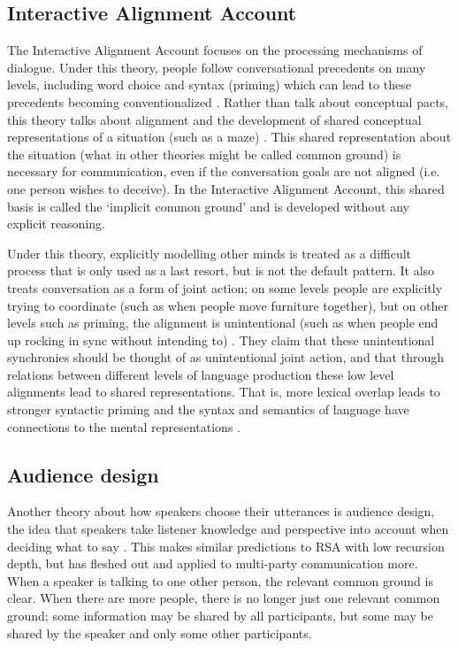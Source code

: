 \documentclass[11pt]{article}
\begin{document}
\subsection{Interactive Alignment Account}
The Interactive Alignment Account focuses on the processing mechanisms of dialogue. Under this theory, people follow conversational precedents on many levels, including word choice and syntax (priming) which can lead to these precedents  becoming  conventionalized \cite{garrodConversationCoordinationConvention1994}. Rather than talk about conceptual pacts, this theory talks about alignment and the development of shared conceptual representations of a situation (such as a maze) \cite{pickeringMechanisticPsychologyDialogue2004}. This shared representation about the situation (what in other theories might be called common ground) is necessary for communication, even if the conversation goals are not aligned (i.e. one person wishes to deceive). In the Interactive Alignment Account, this shared basis is called the `implicit common ground' and is developed without any explicit reasoning. 

Under this theory, explicitly modelling other minds is treated as a difficult process that is only used as a last resort, but is not the default pattern\cite{garrodJointActionInteractive2009}. It also treats conversation as a form of joint action; on some levels people are explicitly trying to coordinate (such as when people move furniture together), but on other levels such as priming, the alignment is unintentional (such as when people end up rocking in sync without intending to) \cite{garrodJointActionInteractive2009}. They claim that these unintentional synchronies should be thought of as unintentional joint action, and that through relations between different levels of language production these low level alignments lead to shared representations. That is, more lexical overlap leads to stronger syntactic priming and the syntax and semantics of language have connections to the mental representations \cite{garrodJointActionInteractive2009}. 

\subsection{Audience design}
Another theory about how speakers choose their utterances is audience design, the idea that speakers take listener knowledge and perspective into account when deciding what to say \cite{brown-schmidtPeopleContextsConversation2015}. This makes similar predictions to RSA with low recursion depth, but has fleshed out and applied to multi-party communication more. When a speaker is talking to one other person, the relevant common ground is clear. When there are more people, there is no longer just one relevant common ground; some information may be shared by all participants, but some may be shared by the speaker and only some other participants. 
\end{document}
